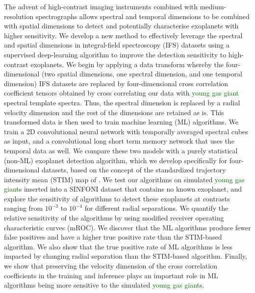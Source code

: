 \documentclass{aa}
\newcommand{\newchange}[1]{\textcolor{darkgreen}{#1}}
\begin{document}
  \abstract
  {The advent of high-contrast imaging instruments combined with medium-resolution spectrographs allows spectral and temporal dimensions to be combined with spatial dimensions to detect and potentially characterise exoplanets with higher sensitivity.}
  {We develop a new method to effectively leverage the spectral and spatial dimensions in integral-field spectroscopy (IFS) datasets using a supervised deep-learning algorithm to improve the detection sensitivity to high-contrast exoplanets.}
  {
  We begin by applying a data transform whereby the four-dimensional (two spatial dimensions, one spectral dimension, and one temporal dimension) IFS datasets are replaced by four-dimensional cross correlation coefficient tensors obtained by cross correlating our data with \newchange{young gas giant} spectral template spectra.
  Thus, the spectral dimension is replaced by a radial velocity dimension and the rest of the dimensions are retained as is.
  This transformed data is then used to train machine learning (ML) algorithms.
  We train a 2D convolutional neural network 
  with temporally averaged spectral cubes as input, and a convolutional long short term memory network that uses the temporal data as well.
  We compare these two models with a purely statistical (non-ML) exoplanet detection algorithm, which we develop specifically for four-dimensional datasets, based on the concept of the standardized trajectory intensity mean (STIM) map of \citet{2019Pairet}.
  We test our algorithms on simulated \newchange{young gas giant}s inserted into a SINFONI dataset that contains no known exoplanet, and explore the sensitivity of algorithms to detect these exoplanets at contrasts ranging from $10^{-3}$ to $10^{-4}$ for different radial separations.
  }
  {%
  We quantify the relative sensitivity of the algorithms by using modified receiver operating characteristic curves (mROC).
  We discover that the ML algorithms produce fewer false positives and have a higher true positive rate than the STIM-based algorithm.
  We also show that the true positive rate of ML algorithms is less impacted by changing radial separation than the STIM-based algorithm.
  Finally, we show that preserving the velocity dimension of the cross correlation coefficients in the training and inference plays an important role in ML algorithms being more sensitive to the simulated \newchange{young gas giant}s.}
\end{document}

